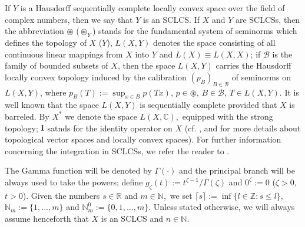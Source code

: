 \documentclass{amsart}
\theoremstyle{definition}
\theoremstyle{remark}
\numberwithin{equation}{section}
\begin{document}
 If $Y$ is a Hausdorff sequentially complete locally convex space over the field of complex numbers, then we say that $Y$ is an SCLCS.
If $X$ and $Y$ are SCLCSs,
then the abbreviation $\circledast$ ($\circledast_{Y}$) stands for the fundamental system of seminorms which defines the topology of $X$ ($Y$), $L(X,Y)$ denotes the space consisting of all continuous linear mappings from $X$ into $Y$ and $L(X)\equiv L(X,X)$; if $\mathcal B$ is the family of bounded subsets of $X$, then the space $L(X,Y)$ carries the Hausdorff locally convex topology induced
by the calibration $(p_{B})_{B\in {\mathcal B}}$ of seminorms on $L(X,Y)$, where $p_B(T):=\sup_{x\in B}p(Tx)$, $p\in\circledast$, $B\in\mathcal B$, $T\in L(X,Y)$.
It is well known that the space $L(X,Y)$ is sequentially complete provided that $X$ is barreled. By $X^{\ast}$ we denote the space $L(X,{\mathbb C}),$ equipped with the strong topology; ${\rm I}$ satnds for the identity operator on $X$ (cf. \cite{jarc}, \cite{meise} and \cite{trev} for more details about topological vector spaces and locally convex spaces). For further information concerning the integration in SCLCSs, we refer the reader to \cite{FKP}. 

The Gamma function will be denoted by $\Gamma(\cdot)$ and the principal branch will be always used to take the powers; define $g_{\zeta}(t):=t^{\zeta-1}/\Gamma(\zeta)$ and
$0^{\zeta}:=0$ ($\zeta>0,$ $t>0$).  
Given the numbers $s\in\mathbb R$ and $m\in {\mathbb N},$ we set $\lceil s\rceil:=\inf\{l\in\mathbb Z:s\leq l\}$, ${\mathbb N}_{m}:=\{1,...,m\} $ and ${\mathbb N}_{m}^{0}:=\{0,1,...,m\} .$ Unless stated otherwise, we will always assume henceforth that $X$ is an SCLCS and $n\in {\mathbb N}.$ \vspace{0.1cm}
\end{document}
